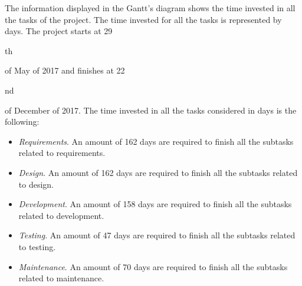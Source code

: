 The information displayed in the Gantt's diagram shows the time invested in all the tasks of the project. The time invested for all the tasks is represented by days. The project starts at 29\begin{small}th\end{small} of May of 2017 and finishes at 22\begin{small}nd\end{small} of December of 2017. The time invested in all the tasks considered in days is the following:

\begin{itemize}

\item \textit{Requirements}. An amount of 162 days are required to finish all the subtasks related to requirements.
\item \textit{Design}. An amount of 162 days are required to finish all the subtasks related to design.
\item \textit{Development}. An amount of 158 days are required to finish all the subtasks related to development.
\item \textit{Testing}. An amount of 47 days are required to finish all the subtasks related to testing.
\item \textit{Maintenance}. An amount of 70 days are required to finish all the subtasks related to maintenance.

\end{itemize}

\newpage
\newpage